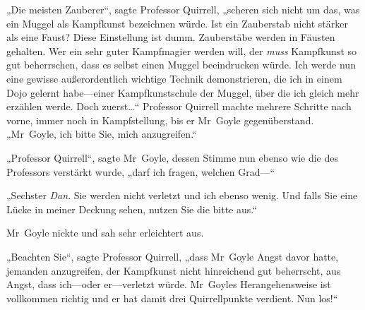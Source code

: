 „Die meisten Zauberer“, sagte Professor Quirrell, „scheren sich nicht um das, was ein Muggel als Kampfkunst bezeichnen würde. Ist ein Zauberstab nicht stärker als eine Faust? Diese Einstellung ist dumm. Zauberstäbe werden in Fäusten gehalten. Wer ein sehr guter Kampfmagier werden will, der \emph{muss} Kampfkunst so gut beherrschen, dass es selbst einen Muggel beeindrucken würde. Ich werde nun eine gewisse außerordentlich wichtige Technik demonstrieren, die ich in einem Dojo gelernt habe—einer Kampfkunstschule der Muggel, über die ich gleich mehr erzählen werde. Doch zuerst…“ Professor Quirrell machte mehrere Schritte nach vorne, immer noch in Kampfstellung, bis er Mr~Goyle gegenüberstand. „Mr~Goyle, ich bitte Sie, mich anzugreifen.“

„Professor Quirrell“, sagte Mr~Goyle, dessen Stimme nun ebenso wie die des Professors verstärkt wurde, „darf ich fragen, welchen Grad—“

„Sechster \emph{Dan}. Sie werden nicht verletzt und ich ebenso wenig. Und falls Sie eine Lücke in meiner Deckung sehen, nutzen Sie die bitte aus.“

Mr~Goyle nickte und sah sehr erleichtert aus.

„Beachten Sie“, sagte Professor Quirrell, „dass Mr~Goyle Angst davor hatte, jemanden anzugreifen, der Kampfkunst nicht hinreichend gut beherrscht, aus Angst, dass ich—oder er—verletzt würde. Mr~Goyles Herangehensweise ist vollkommen richtig und er hat damit drei Quirrellpunkte verdient. Nun los!“

